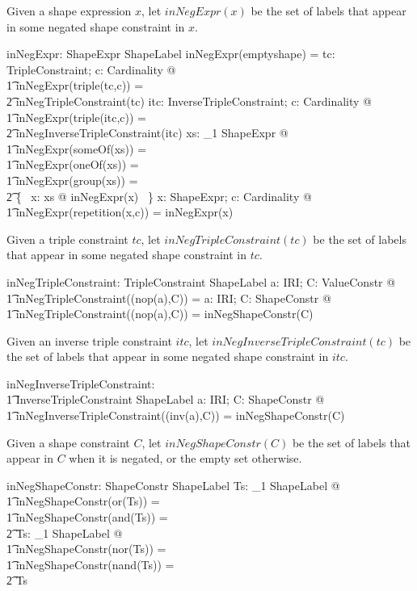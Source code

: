\documentclass{article}
\begin{document}
Given a shape expression $x$, let $inNegExpr(x)$ be the set of labels that appear in some negated shape constraint in $x$.
\begin{axdef}
	inNegExpr: ShapeExpr \fun \finset ShapeLabel
\where
	inNegExpr(emptyshape) = \emptyset
\also
	\forall tc: TripleConstraint; c: Cardinality @ \\
\t1		inNegExpr(triple(tc,c)) = \\
\t2			inNegTripleConstraint(tc)
\also
	\forall itc: InverseTripleConstraint; c: Cardinality @ \\
\t1		inNegExpr(triple(itc,c)) = \\
\t2			inNegInverseTripleConstraint(itc)
\also
	\forall xs: \seq_1 ShapeExpr @ \\
\t1		inNegExpr(someOf(xs)) = \\
\t1		inNegExpr(oneOf(xs)) = \\
\t1		inNegExpr(group(xs)) = \\
\t2			\bigcup \{~ x: \ran xs @ inNegExpr(x) ~\}
\also
	\forall x: ShapeExpr; c: Cardinality @ \\
\t1		inNegExpr(repetition(x,c)) = inNegExpr(x)
\end{axdef}

Given a triple constraint $tc$, let $inNegTripleConstraint(tc)$ be the set of labels that appear in some negated shape constraint in $tc$.
\begin{axdef}
	inNegTripleConstraint: TripleConstraint \fun \finset ShapeLabel
\where
	\forall a: IRI; C: ValueConstr @ \\
\t1		inNegTripleConstraint((nop(a),C)) = \emptyset
\also
	\forall a: IRI; C: ShapeConstr @ \\
\t1		inNegTripleConstraint((nop(a),C)) = inNegShapeConstr(C)
\end{axdef}

Given an inverse triple constraint $itc$, let $inNegInverseTripleConstraint(tc)$ be the set of labels that appear in some negated shape constraint in $itc$.
\begin{axdef}
	inNegInverseTripleConstraint: \\
\t1		InverseTripleConstraint \fun \finset ShapeLabel
\where
	\forall a: IRI; C: ShapeConstr @ \\
\t1		inNegInverseTripleConstraint((inv(a),C)) = inNegShapeConstr(C)
\end{axdef}

Given a shape constraint $C$, let $inNegShapeConstr(C)$ be the set of labels that appear in $C$ when it is negated, or the
empty set otherwise.
\begin{axdef}
	inNegShapeConstr: ShapeConstr \fun \finset ShapeLabel
\where
	\forall Ts: \seq_1 ShapeLabel @ \\
\t1		inNegShapeConstr(or(Ts)) = \\
\t1		inNegShapeConstr(and(Ts)) = \\
\t2			\emptyset
\also
	\forall Ts: \seq_1 ShapeLabel @ \\
\t1		inNegShapeConstr(nor(Ts)) = \\
\t1		inNegShapeConstr(nand(Ts)) = \\
\t2			\ran Ts
\end{axdef}
\end{document}
